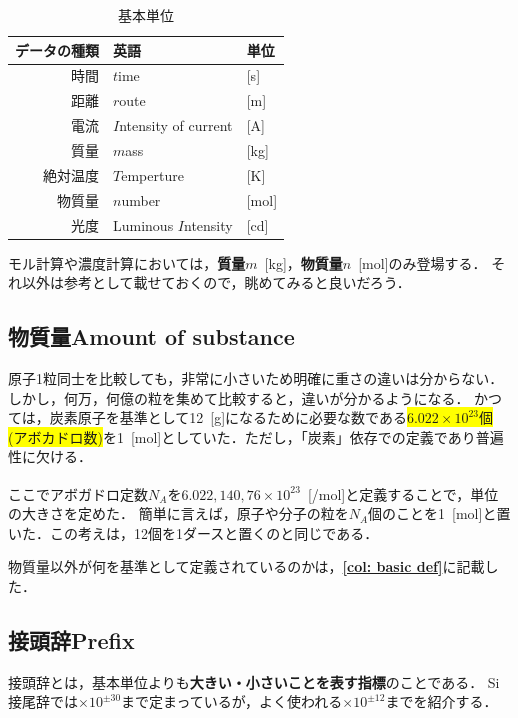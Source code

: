 \documentclass[a4paper,11pt]{ltjsarticle}
\numberwithin{equation}{section}
\renewcommand{\cite}[1]{\textsuperscript{\citep{#1}}}
\begin{document}
\begin{table}[hbtp]
  \caption{基本単位}
  \label{tab: basic units}
  \centering
  \begin{tabular}{rll}
    \hline
    データの種類 & 英語 & 単位 \\
    \hline
    時間 & {\color{cyan}$t$}ime & [s] \\
    距離 & {\color{cyan}$r$}oute & [m] \\
    電流 & {\color{cyan}$I$}ntensity of current & [A] \\
    質量 & {\color{cyan}$m$}ass & [kg] \\
    絶対温度 & {\color{cyan}$T$}emperture & [K] \\
    物質量 & {\color{cyan}$n$}umber & [mol] \\
    光度 & Luminous {\color{cyan}$I$}ntensity & [cd] \\
    \hline
  \end{tabular}
\end{table}

モル計算や濃度計算においては，\textbf{質量}$m$\ [kg]，\textbf{物質量}$n$\ [mol]のみ登場する．
それ以外は参考として載せておくので，眺めてみると良いだろう．

\subsection{物質量Amount of substance}

原子1粒同士を比較しても，非常に小さいため明確に重さの違いは分からない．しかし，何万，何億の粒を集めて比較すると，違いが分かるようになる．
かつては，炭素原子を基準として12\ [g]になるために必要な数である\colorbox{yellow}{$6.022 \times 10^{23}$個(アボカドロ数)}を1\ [mol]としていた．ただし，「炭素」依存での定義であり普遍性に欠ける．

ここでアボガドロ定数$N_A$を$6.022,140,76 \times 10^{23}$\ [/mol]と定義\cite{units-6}することで，単位の大きさを定めた．
簡単に言えば，原子や分子の粒を$N_A$個のことを1\ [mol]と置いた．この考えは，12個を1ダースと置くのと同じである．

物質量以外が何を基準として定義されているのかは，\textbf{\cref{col: basic def}}に記載した．

\subsection{接頭辞Prefix}
\label{sec: prefix}

接頭辞とは，基本単位よりも\textbf{大きい・小さいことを表す指標}のことである．
Si接尾辞では$\times 10^{\pm 30}$まで定まっているが，よく使われる$\times 10^{\pm 12}$までを紹介する．
\end{document}
